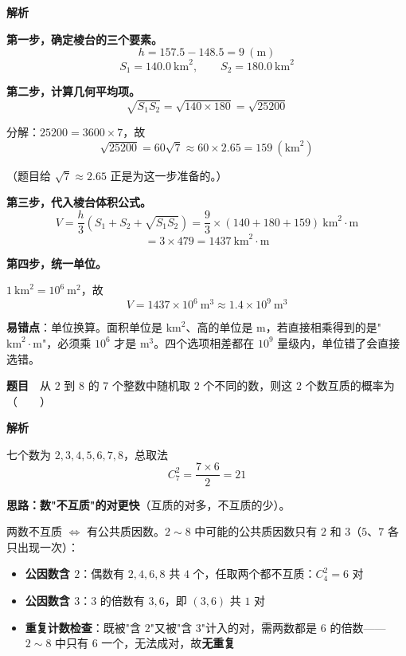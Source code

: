 \textbf{解析}

\textbf{第一步，确定棱台的三个要素。}
\[h=157.5-148.5=9\ (\mathrm m)\]
\[S_1=140.0\ \mathrm{km}^{2},\qquad S_2=180.0\ \mathrm{km}^{2}\]

\textbf{第二步，计算几何平均项。}
\[\sqrt{S_1S_2}=\sqrt{140\times180}=\sqrt{25200}\]

分解：$25200=3600\times7$，故
\[\sqrt{25200}=60\sqrt7\approx60\times2.65=159\ (\mathrm{km}^{2})\]

（题目给 $\sqrt7\approx2.65$ 正是为这一步准备的。）

\textbf{第三步，代入棱台体积公式。}
\[V=\frac h3\left(S_1+S_2+\sqrt{S_1S_2}\right)=\frac93\times(140+180+159)\ \mathrm{km}^{2}\cdot\mathrm m\]
\[=3\times479=1437\ \mathrm{km}^{2}\cdot\mathrm m\]

\textbf{第四步，统一单位。}

$1\ \mathrm{km}^{2}=10^{6}\ \mathrm m^{2}$，故
\[V=1437\times10^{6}\ \mathrm m^{3}\approx1.4\times10^{9}\ \mathrm m^{3}\]


\begin{gktip}
\textbf{易错点}：单位换算。面积单位是 $\mathrm{km}^2$、高的单位是 $\mathrm m$，若直接相乘得到的是"$\mathrm{km}^2\cdot\mathrm m$"，必须乘 $10^{6}$ 才是 $\mathrm m^3$。四个选项相差都在 $10^{9}$ 量级内，单位错了会直接选错。
\end{gktip}

\par\medskip


\textbf{题目}　从 $2$ 到 $8$ 的 $7$ 个整数中随机取 $2$ 个不同的数，则这 $2$ 个数互质的概率为（　　）

\textbf{解析}

七个数为 $2,3,4,5,6,7,8$，总取法
\[C_7^{2}=\frac{7\times6}2=21\]

\textbf{思路：数"不互质"的对更快}（互质的对多，不互质的少）。

两数不互质 $\iff$ 有公共质因数。$2\sim8$ 中可能的公共质因数只有 $2$ 和 $3$（$5$、$7$ 各只出现一次）：

\begin{itemize}
\item \textbf{公因数含 $2$}：偶数有 $2,4,6,8$ 共 $4$ 个，任取两个都不互质：$C_4^{2}=6$ 对
\item \textbf{公因数含 $3$}：$3$ 的倍数有 $3,6$，即 $(3,6)$ 共 $1$ 对
\item \textbf{重复计数检查}：既被"含 $2$"又被"含 $3$"计入的对，需两数都是 $6$ 的倍数——$2\sim8$ 中只有 $6$ 一个，无法成对，故\textbf{无重复}
\end{itemize}

